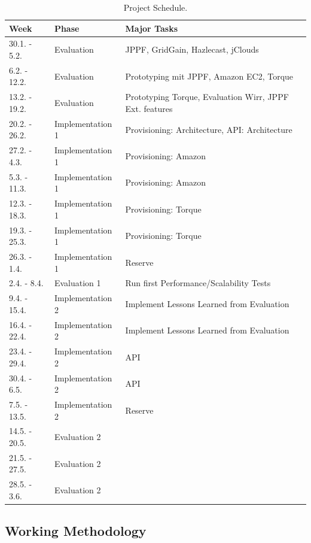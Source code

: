 \documentclass{article}
\begin{document}
\begin{table}[hptb]
\centering
\begin{tabular}{|l|l|l|}
\hline
\textbf{Week} & \textbf{Phase} & \textbf{Major Tasks} \\ \hline
30.1. - 5.2. & Evaluation & JPPF, GridGain, Hazlecast, jClouds \\ \hline
6.2. - 12.2. & Evaluation & Prototyping mit JPPF, Amazon EC2, Torque \\ \hline
13.2. - 19.2. & Evaluation & Prototyping Torque, Evaluation Wirr, JPPF Ext. features \\ \hline
20.2. - 26.2. & Implementation 1 & Provisioning: Architecture, API: Architecture \\ \hline
27.2. - 4.3. & Implementation 1 & Provisioning: Amazon \\ \hline
5.3. - 11.3. & Implementation 1 & Provisioning: Amazon \\ \hline
12.3. - 18.3. & Implementation 1 & Provisioning: Torque \\ \hline
19.3. - 25.3. & Implementation 1 & Provisioning: Torque \\ \hline
26.3. - 1.4. & Implementation 1 & Reserve \\ \hline
2.4. - 8.4. & Evaluation 1 & Run first Performance/Scalability Tests \\ \hline
9.4. - 15.4. & Implementation 2 & Implement Lessons Learned from Evaluation \\ \hline
16.4. - 22.4. & Implementation 2 & Implement Lessons Learned from Evaluation \\ \hline
23.4. - 29.4. & Implementation 2 & API \\ \hline
30.4. - 6.5. & Implementation 2 & API \\ \hline
7.5. - 13.5. & Implementation 2 & Reserve \\ \hline
14.5. - 20.5. & Evaluation 2 &  \\ \hline
21.5. - 27.5. & Evaluation 2 &  \\ \hline
28.5. - 3.6. & Evaluation 2 &  \\ \hline
\end{tabular}
\caption{Project Schedule.}
\label{tab:schedule}
\end{table}

\subsection{Working Methodology}
\end{document}
